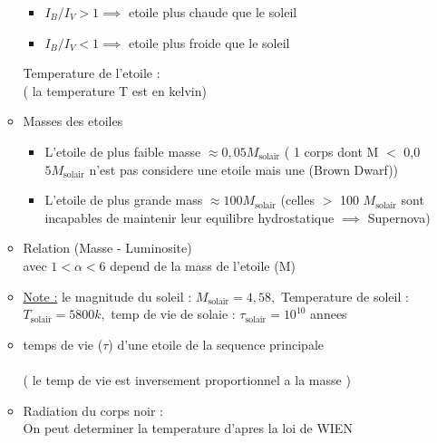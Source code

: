 \documentclass[12pt]{book}
\begin{document}
\begin{itemize}
\begin{itemize}
                        \begin{itemize}
                            \item $ I_B/I_V > 1 \implies  $ etoile plus chaude que le soleil 
                            \item $ I_B/I_V < 1 \implies $ etoile plus froide que le soleil 
                        \end{itemize}
                        Temperature de l'etoile : \\
                             ( la temperature T est en kelvin)
                    \item Masses des etoiles 
                        \begin{itemize}
                            \item L'etoile de plus faible masse $ \approx 0,05 M_\text{solair} $ ( 1 corps dont M $<$ 0,0$5M_\text{solair}$ n'est pas considere une etoile mais une (Brown Dwarf)) 
                            \item L'etoile de plus grande mass $ \approx 100M_\text{solair} $ (celles $>$ 100 $ M_\text{solair} $ sont incapables de maintenir leur equilibre hydrostatique $ \implies $ Supernova)  
                        \end{itemize}
                    \item Relation (Masse - Luminosite) \\
                         avec $ 1<\alpha<6 $ depend de la mass de l'etoile (M) 
                    \item \underline{Note :} le magnitude du soleil : $M_\text{solair} = 4,58 ,$ Temperature de soleil : $ T_\text{solair} = 5800k , $ temp de vie de solaie : $\tau_\text{solair} = 10^{10}  $ annees
                    \item temps de vie ($ \tau $) d'une etoile de la sequence principale \\
                         \\
                        ( le temp de vie est inversement proportionnel a la masse )
                    \item Radiation du corps noir : \\
                        On peut determiner la temperature d'apres la loi de WIEN  \\

\end{itemize}
\end{itemize}
\end{document}
